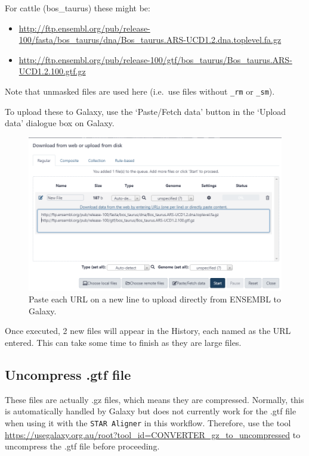 \documentclass[
]{book}
\providecommand{\tightlist}{%
  \setlength{\itemsep}{0pt}\setlength{\parskip}{0pt}}
\begin{document}
For cattle (bos\_taurus) these might be:

\begin{itemize}
\tightlist
\item
  \url{http://ftp.ensembl.org/pub/release-100/fasta/bos_taurus/dna/Bos_taurus.ARS-UCD1.2.dna.toplevel.fa.gz}
\item
  \url{http://ftp.ensembl.org/pub/release-100/gtf/bos_taurus/Bos_taurus.ARS-UCD1.2.100.gtf.gz}
\end{itemize}

Note that unmasked files are used here (i.e.~use files without \texttt{\_rm} or \texttt{\_sm}).

To upload these to Galaxy, use the `Paste/Fetch data' button in the `Upload data' dialogue box on Galaxy.

\begin{figure}

{\centering \includegraphics[width=1\linewidth]{images/image_upload_url} 

}

\caption{Paste each URL on a new line to upload directly from ENSEMBL to Galaxy.}\label{fig:paste-url}
\end{figure}

Once executed, 2 new files will appear in the History, each named as the URL entered. This can take some time to finish as they are large files.

\hypertarget{uncompress-.gtf-file}{%
\subsection{Uncompress .gtf file}\label{uncompress-.gtf-file}}

These files are actually .gz files, which means they are compressed. Normally, this is automatically handled by Galaxy but does not currently work for the .gtf file when using it with the \texttt{STAR\ Aligner} in this workflow. Therefore, use the tool \url{https://usegalaxy.org.au/root?tool_id=CONVERTER_gz_to_uncompressed} to uncompress the .gtf file before proceeding.
\end{document}
